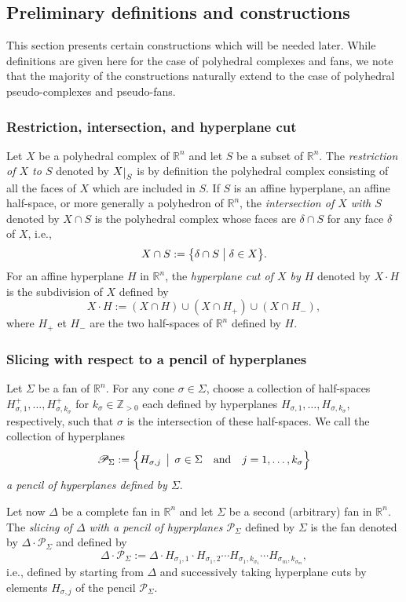 \documentclass[11pt]{amsart}
\theoremstyle{definition}
\numberwithin{equation}{section}
\newcommand{\ie}{i.e.}
\renewcommand{\~}{\widetilde}
\newcommand{\Z}{\mathbb{Z}}
\newcommand{\R}{\mathbb{R}}
\newcommand{\rest}[1]{\raisebox{-1pt}{$\vert$}_{#1}}
\newcommand{\st}{\bigm|} %
\newcommand{\pen}{\mathscr P} %
\begin{document}
\subsection{Preliminary definitions and constructions}

This section presents certain constructions which will be needed later. While definitions are given here for the case of polyhedral complexes and fans, we note that the majority of the constructions naturally extend to the case of polyhedral pseudo-complexes and pseudo-fans.


\subsubsection{Restriction, intersection, and hyperplane cut}

Let $X$ be a polyhedral complex of $\R^n$ and let $S$ be a subset of $\R^n$. The \emph{restriction of $X$ to $S$} denoted by $X\rest S$ is by definition the polyhedral complex consisting of all the faces of $X$ which are included in $S$. If $S$ is an affine hyperplane, an affine half-space, or more generally a polyhedron of $\R^n$, the \emph{intersection of $X$ with $S$} denoted by $X\cap S$ is the polyhedral complex whose faces are $\delta \cap S$ for any face $\delta$ of $X$, i.e.,
\[ X\cap S:=\bigl\{\delta\cap S\st \delta\in X\bigr\}. \]
For an affine hyperplane $H$ in $\R^n$, the \emph{hyperplane cut of $X$ by $H$} denoted by $X\cdot H$ is the subdivision of $X$ defined by
\[ X\cdot H:=(X\cap H)\cup(X\cap H_+)\cup(X\cap H_-), \]
where $H_+$ et $H_-$ are the two half-spaces of $\R^n$ defined by $H$.


\subsubsection{Slicing with respect to a pencil of hyperplanes} Let $\Sigma$ be a fan of $\R^n$. For any cone $\sigma \in \Sigma$, choose a collection of half-spaces $H^+_{\sigma,1}, \dots, H^+_{\sigma,k_\sigma}$ for $k_\sigma \in \Z_{>0}$ each defined by hyperplanes $H_{\sigma,1}, \dots, H_{\sigma,k_\sigma}$, respectively, such that $\sigma$ is the intersection of these half-spaces.
We call the collection of hyperplanes
\[\pen_\Sigma:= \Bigl\{H_{\sigma, j} \, \st \, \sigma \in \Sigma \quad \textrm{and} \quad j =1, \dots, k_\sigma\Bigr\}\]
\emph{a pencil of hyperplanes defined by $\Sigma$}.

\medskip

Let now $\Delta$ be a complete fan in $\R^n$ and let $\Sigma$ be a second (arbitrary) fan in $\R^n$. The \emph{slicing of $\Delta$ with a pencil of hyperplanes $\pen_\Sigma$} defined by $\Sigma$ is the fan denoted by $\Delta \cdot \pen_\Sigma$ and defined by
\[ \Delta\cdot \pen_{\Sigma} := \Delta \cdot H_{\sigma_1,1} \cdot H_{\sigma_1,2}\cdots H_{\sigma_1,k_{\sigma_1}}\cdots H_{\sigma_m,k_{\sigma_m}}, \]
\ie, defined by starting from $\Delta$ and successively taking hyperplane cuts by elements $H_{\sigma,j}$ of the pencil $ \pen_\Sigma$.
\end{document}
